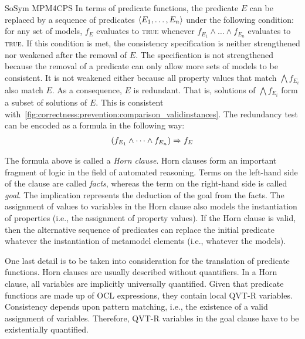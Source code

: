 \begin{copiedFrom}{SoSym MPM4CPS}
In terms of predicate functions, the predicate $E$ can be replaced by a sequence of predicates $\langle E_1, \dots, E_n \rangle$ under the following condition: for any set of models, $f_E$ evaluates to \textsc{true} whenever $f_{E_1} \wedge \dots \wedge f_{E_n}$ evaluates to \textsc{true}. If this condition is met, the consistency specification is neither strengthened nor weakened after the removal of $E$. The specification is not strengthened because the removal of a predicate can only allow more sets of models to be consistent. It is not weakened either because all property values that match $\bigwedge f_{E_i}$ also match $E$. As a consequence, $E$ is redundant. That is, solutions of $\bigwedge f_{E_i}$ form a subset of solutions of $E$. This is consistent with~\autoref{fig:correctness:prevention:comparison_validinstances}. The redundancy test can be encoded as a formula in the following way:
\begin{align*}
    \hspace{1em} &
    (f_{E_1} \wedge \dots \wedge f_{E_n}) \Rightarrow f_{E}
\end{align*}

The formula above is called a \textit{Horn clause}. Horn clauses form an important fragment of logic in the field of automated reasoning. Terms on the left-hand side of the clause are called \textit{facts}, whereas the term on the right-hand side is called \textit{goal}. The implication represents the deduction of the goal from the facts. The assignment of values to variables in the Horn clause also models the instantiation of properties (i.e., the assignment of property values). If the Horn clause is valid, then the alternative sequence of predicates can replace the initial predicate whatever the instantiation of metamodel elements (i.e., whatever the models).

One last detail is to be taken into consideration for the translation of predicate functions. Horn clauses are usually described without quantifiers. In a Horn clause, all variables are implicitly universally quantified. Given that predicate functions are made up of OCL expressions, they contain local QVT-R variables. Consistency depends upon pattern matching, i.e., the existence of a valid assignment of variables. Therefore, QVT-R variables in the goal clause have to be existentially quantified.


\end{copiedFrom}
